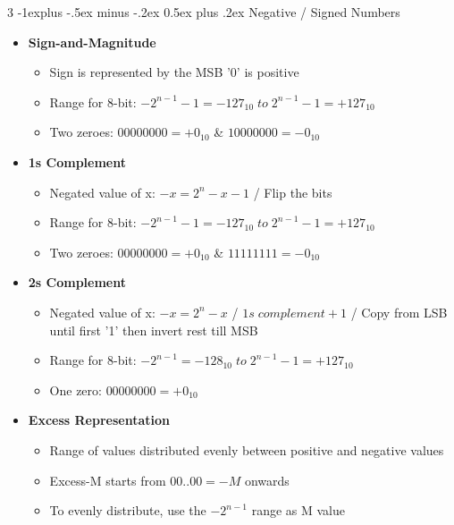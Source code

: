 \documentclass[10pt,landscape]{article}
\makeatletter
\renewcommand{\subsection}{\@startsection{subsection}{2}{0mm}%
    {-1explus -.5ex minus -.2ex}%
    {0.5ex plus .2ex}%
    {\normalfont\normalsize\bfseries}}
\makeatother
\begin{document}
\begin{multicols}{3}
    \subsection{Negative / Signed Numbers}

    \begin{itemize}
        \item \textbf{Sign-and-Magnitude}
              \begin{itemize}
                  \item Sign is represented by the MSB '0' is positive
                  \item Range for 8-bit: \(-2^{n-1} - 1 = -127_{10} \; to \; 2^{n-1} - 1 = +127_{10}\)
                  \item Two zeroes: \(00000000 = +0_{10}\) \& \(10000000 = -0_{10}\)
              \end{itemize}
        \item \textbf{1s Complement}
              \begin{itemize}
                  \item Negated value of x: \(-x = 2^n - x - 1\) / Flip the bits
                  \item Range for 8-bit: \(-2^{n-1} - 1 = -127_{10} \; to \; 2^{n-1} - 1 = +127_{10}\)
                  \item Two zeroes: \(00000000 = +0_{10}\) \& \(11111111 = -0_{10}\)
              \end{itemize}
        \item \textbf{2s Complement}
              \begin{itemize}
                  \item Negated value of x: \(-x = 2^n - x\) / \(1s \; complement + 1\) / Copy from LSB until first '1' then invert rest till MSB
                  \item Range for 8-bit: \(-2^{n-1} = -128_{10} \; to \; 2^{n-1} - 1 = +127_{10}\)
                  \item One zero: \(00000000 = +0_{10}\)
              \end{itemize}
        \item \textbf{Excess Representation}
              \begin{itemize}
                  \item Range of values distributed evenly between positive and negative values
                  \item Excess-M starts from \(00..00 = -M\) onwards
                  \item To evenly distribute, use the \(-2^{n-1}\) range as M value
              \end{itemize}
    \end{itemize}


\end{multicols}
\end{document}
